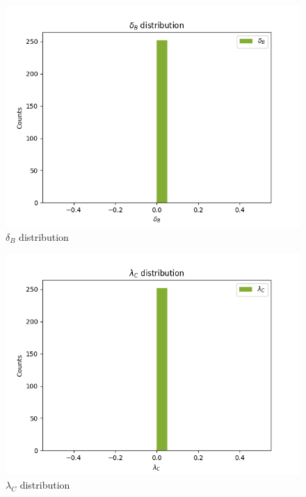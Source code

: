 \documentclass[
]{article}
\begin{document}
\begin{figure}
\centering
\includegraphics{pngplots/param9.png}
\caption{\(\delta_B\) distribution}
\end{figure}

\begin{figure}
\centering
\includegraphics{pngplots/param10.png}
\caption{\(\lambda_C\) distribution}
\end{figure}
\end{document}
